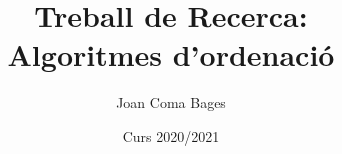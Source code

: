 \documentclass[a4paper,12pt]{report}
\begin{document}
	\title{Treball de Recerca: \\ Algoritmes d'ordenació}
	\author{Joan Coma Bages}
	\date{Curs 2020/2021}

	\maketitle
	\tableofcontents
	
	
	
	
	
	
	
	
	
	
	
\end{document}
